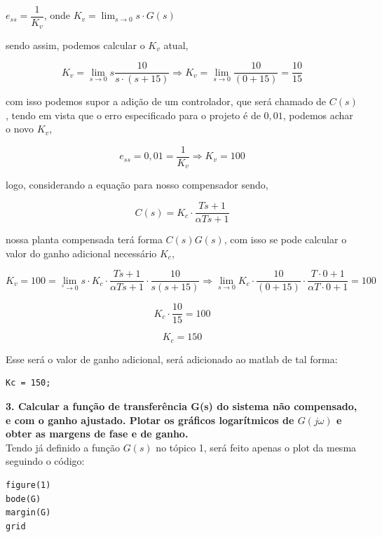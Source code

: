 \begin{center}
\( e_{ss} = \dfrac{1}{K_v} \), onde \( K_v = \lim_{s \to 0} s\cdot G(s) \)
\end{center}

sendo assim, podemos calcular o $K_v$ atual,

\[ K_v = \lim_{s \to 0} s \dfrac{10}{s\cdot(s+15)} \Rightarrow K_v = \lim_{ s \to 0} \dfrac{10}{(0+15)} = \dfrac{10}{15}\]

com isso podemos supor a adição de um controlador, que será chamado de $C(s)$, tendo em vista que o erro especificado para o projeto é de $0,01$, podemos achar o novo $K_v$, \newpage

\[e_{ss} = 0,01 = \dfrac{1}{K_v} \Rightarrow K_v = 100\]

logo, considerando a equação para nosso compensador sendo,

\[ C(s) = K_c \cdot \dfrac{Ts + 1}{\alpha T s + 1} \]

nossa planta compensada terá forma $C(s)G(s)$, com isso se pode calcular o valor do ganho adicional necessário $K_c$,

\[K_{v} = 100 = \lim_{^s \to 0} s \cdot K_c \cdot \dfrac{Ts + 1}{\alpha T s + 1} \cdot \dfrac{10}{s(s+15)} \Rightarrow \lim_{s \to 0} K_c \cdot \dfrac{10}{(0+15)}\cdot \dfrac{T\cdot 0 + 1}{\alpha T \cdot 0 + 1} = 100 \]

\[ K_c \cdot \dfrac{10}{15} = 100\]

{\color{red}
	\[\boxed{K_c = 150}\]
}

Esse será o valor de ganho adicional, será adicionado ao matlab de tal forma:

\begin{lstlisting}[style=matlab]
Kc = 150;
\end{lstlisting}\vspace{0.2cm}




\noindent\textbf{3. Calcular a função de transferência G(s) do sistema não compensado, e com o ganho ajustado. Plotar os gráficos logarítmicos de $G(j\omega)$ e obter as margens de fase e de ganho.}\\

Tendo já definido a função $G(s)$ no tópico 1, será feito apenas o plot da mesma seguindo o código:

\begin{lstlisting}[style=matlab]
figure(1)
bode(G)
margin(G)
grid
\end{lstlisting}\vspace{0.2cm}


